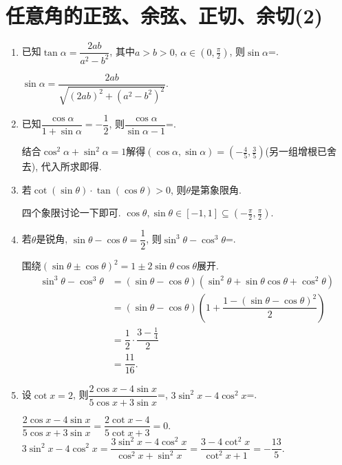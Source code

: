 \section{任意角的正弦、余弦、正切、余切(2)}


\begin{enumerate}
\item 已知$\tan\alpha=\dfrac{2ab}{a^2-b^2}$, 其中$a>b>0$, $\alpha\in\left(0,\frac{\pi}{2}\right)$, 则$\sin\alpha$=.
\begin{jieda}
$\sin\alpha=\dfrac{2ab}{\sqrt{\left(2ab\right)^2+\left(a^2-b^2\right)^2}}$. 
\end{jieda}


\item 已知$\dfrac{\cos\alpha}{1+\sin\alpha}=-\dfrac{1}{2}$, 则$\dfrac{\cos\alpha}{\sin\alpha-1}$=. 
\begin{jieda}
结合$\cos^2\alpha+\sin^2\alpha=1$解得$\left(\cos\alpha,\sin\alpha\right)=\left(-\frac{4}{5},\frac{3}{5}\right)$(另一组增根已舍去), 
代入所求即得. 
\end{jieda}



\item 若$\cot\left(\sin\theta\right)\cdot\tan\left(\cos\theta\right)>0$, 则$\theta$是第象限角. 
\begin{jieda}
四个象限讨论一下即可. $\cos\theta,\sin\theta\in[-1,1]\subseteq\left(-\frac{\pi}{2},\frac{\pi}{2}\right)$. 
\end{jieda}



\item 若$\theta$是锐角, $\sin\theta-\cos\theta=\dfrac{1}{2}$, 则$\sin^3\theta-\cos^3\theta$=. 
\begin{jieda}
围绕$\left(\sin\theta\pm\cos\theta\right)^2=1\pm2\sin\theta\cos\theta$展开. 
\begin{align*}
\sin^3\theta-\cos^3\theta & =\left(\sin\theta-\cos\theta\right)\left(\sin^2\theta+\sin\theta\cos\theta+\cos^2\theta\right)\\
& = \left(\sin\theta-\cos\theta\right)\left(1+\dfrac{1-\left(\sin\theta-\cos\theta\right)^2}{2}\right)\\
& = \dfrac{1}{2}\cdot\dfrac{3-\frac{1}{4}}{2}\\
& = \dfrac{11}{16}.
\end{align*}
\end{jieda}



\item 设$\cot{x}=2$, 则$\dfrac{2\cos{x}-4\sin{x}}{5\cos{x}+3\sin{x}}$=, 
$3\sin^2x-4\cos^2x$=. 
\begin{jieda}
$\dfrac{2\cos{x}-4\sin{x}}{5\cos{x}+3\sin{x}}=\dfrac{2\cot{x}-4}{5\cot{x}+3}=0$. \\
$3\sin^2x-4\cos^2x=\dfrac{3\sin^2x-4\cos^2x}{\cos^2x+\sin^2x}=\dfrac{3-4\cot^2x}{\cot^2x+1}=-\dfrac{13}{5}$. 
\end{jieda}


\end{enumerate}
